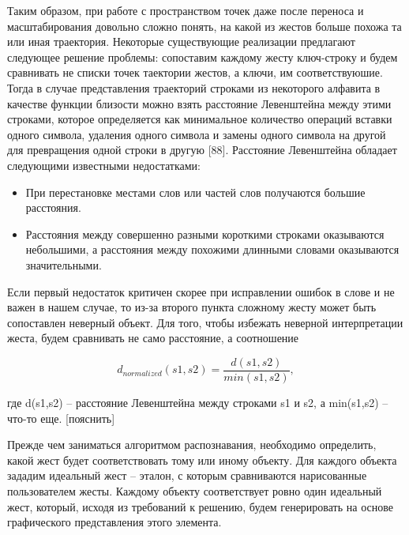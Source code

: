 \documentclass[a5paper]{article}
\begin{document}
Таким образом, при работе с пространством точек даже после переноса и масштабирования довольно сложно понять, на какой из жестов 
больше похожа та или иная траектория. Некоторые существующие реализации предлагают следующее решение проблемы: сопоставим каждому жесту 
ключ-строку и будем сравнивать не списки точек таектории жестов, а ключи, им соответствуюшие. Тогда в случае представления траекторий 
строками из некоторого алфавита в качестве функции близости можно взять расстояние Левенштейна 
между этими строками, которое определяется как минимальное количество операций вставки одного символа, удаления одного символа и замены 
одного символа на другой для превращения одной строки в другую [88]. Расстояние Левенштейна обладает следующими известными недостатками:
\begin{itemize}
  \item При перестановке местами слов или частей слов получаются большие расстояния.
  \item Расстояния между совершенно разными короткими строками оказываются небольшими, а расстояния между похожими длинными словами 
оказываются значительными.
\end{itemize}
Если первый недостаток критичен скорее при исправлении ошибок в слове и не важен в нашем случае, то из-за второго пункта сложному 
жесту может быть сопоставлен неверный объект. Для того, чтобы избежать неверной интерпретации жеста, будем сравнивать не само расстояние, 
а соотношение 

\begin{equation}
\label{levenshtein}
d_{normalized}(s1,s2) = \frac{d(s1,s2)}{min(s1,s2)},
\end{equation}

где d(s1,s2) -- расстояние Левенштейна между строками s1 и s2, а min(s1,s2) -- что-то еще. [пояснить]

Прежде чем заниматься алгоритмом распознавания, необходимо определить, какой жест будет соответствовать тому или иному объекту. Для каждого 
объекта зададим идеальный жест -- эталон, с которым сравниваются нарисованные пользователем жесты. Каждому объекту соответствует ровно один 
идеальный жест, который, исходя из требований к решению, будем генерировать на основе графического представления этого элемента. 
\end{document}
